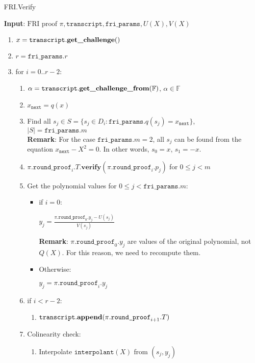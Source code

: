 \begin{algorithm}[H]
\caption{FRI.Verify}
\textbf{Input}: $\text{FRI proof } \pi, \texttt{transcript}, \texttt{fri\_params}, U(X), V(X)$
\begin{enumerate}
	\item $x = \texttt{transcript}.\textbf{get\_challenge}()$
	\item $r = \texttt{fri\_params}.r$
	\item for $i = 0..r - 2$:
	\begin{enumerate}
		\item $\alpha = \texttt{transcript}.\textbf{get\_challenge\_from}(\mathbb{F})$,  $\alpha \in \mathbb{F}$
		\item $x_{\texttt{next}} = q(x)$
		\item Find all $s_j \in S = \{ s_j \in D_i : \texttt{fri\_params}.q(s_j) =x_{\texttt{next}} \}$, $|S| = \texttt{fri\_params}.m$ \\
				\textbf{Remark}: For the case $\texttt{fri\_params}.m = 2$, all $s_j$ can be found from the equation $x_{\texttt{next}} - X^2 = 0$.
				In other words, $s_0 = x$, $s_1 = -x$.
		\item $\pi.\texttt{round\_proof}_{i}.T.\textbf{verify}(\pi.\texttt{round\_proof}_i.p_j)$ for $0 \leq j < m$
		\item Get the polynomial values for $0 \leq j < \texttt{fri\_params}.m$:
		\begin{itemize}
			\item if $i = 0$:
					\begin{center}
						$y_j = \frac{\pi.\texttt{round\_proof}_0.y_j - U(s_j)}{V(s_j)}$
					\end{center}
					\textbf{Remark}: $\pi.\texttt{round\_proof}_0.y_j$ are values of the original polynomial, not $Q(X)$.
					For this reason, we need to recompute them. 
			\item Otherwise:
						\begin{center}
							$y_j = \pi.\texttt{round\_proof}_i.y_j$
						\end{center}
		\end{itemize}
		\item if $i < r - 2$:
			\begin{enumerate}
				\item $\texttt{transcript}.\textbf{append}(\pi.\texttt{round\_proof}_{i + 1}.T)$
			\end{enumerate}
		\item Colinearity check:
		\begin{enumerate}
			\item Interpolate $\texttt{interpolant}(X)$ from $(s_j, y_j)$

\end{enumerate}
\end{enumerate}
\end{enumerate}
\end{algorithm}
